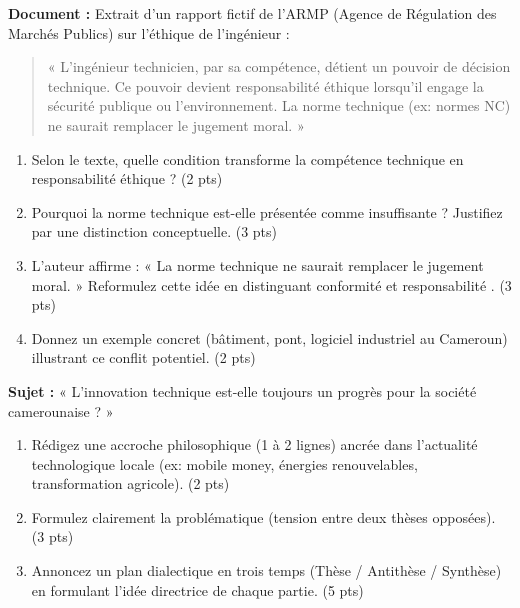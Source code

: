 \documentclass[11pt]{article}
\begin{document}
\begin{exercice}
\textbf{Document :} Extrait d'un rapport fictif de l'ARMP (Agence de Régulation des Marchés Publics) sur l'éthique de l'ingénieur : 
\begin{quote}
« L'ingénieur technicien, par sa compétence, détient un pouvoir de décision technique. Ce pouvoir devient responsabilité éthique lorsqu'il engage la sécurité publique ou l'environnement. La norme technique (ex: normes NC) ne saurait remplacer le jugement moral. »
\end{quote}
\begin{enumerate}
    \item Selon le texte, quelle condition transforme la compétence technique en responsabilité éthique ? (2 pts)
    \item Pourquoi la norme technique est-elle présentée comme insuffisante ? Justifiez par une distinction conceptuelle. (3 pts)
    \item L'auteur affirme : « La norme technique ne saurait remplacer le jugement moral. » Reformulez cette idée en distinguant \og conformité \fg{} et \og responsabilité \fg{}. (3 pts)
    \item Donnez un exemple concret (bâtiment, pont, logiciel industriel au Cameroun) illustrant ce conflit potentiel. (2 pts)
\end{enumerate}
\end{exercice}

\begin{exercice}
\textbf{Sujet :} « L'innovation technique est-elle toujours un progrès pour la société camerounaise ? »
\begin{enumerate}
    \item Rédigez une accroche philosophique (1 à 2 lignes) ancrée dans l'actualité technologique locale (ex: mobile money, énergies renouvelables, transformation agricole). (2 pts)
    \item Formulez clairement la problématique (tension entre deux thèses opposées). (3 pts)
    \item Annoncez un plan dialectique en trois temps (Thèse / Antithèse / Synthèse) en formulant l'idée directrice de chaque partie. (5 pts)
\end{enumerate}
\end{exercice}
\end{document}
